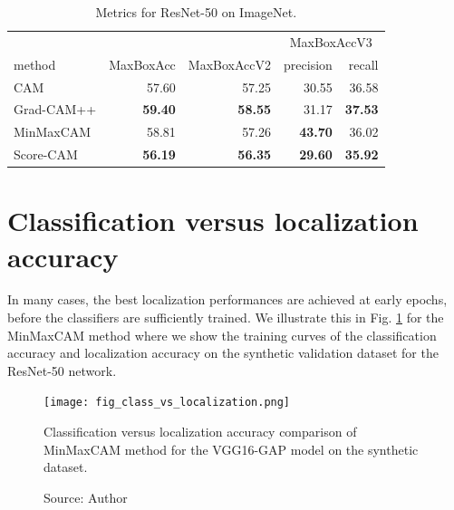 \begin{table}[ht]
\centering
\begin{tabular}{lrrrr}
\toprule
 & & & \multicolumn{2}{c}{MaxBoxAccV3} \\
method & MaxBoxAcc & MaxBoxAccV2 & precision & recall \\
\cmidrule(lr){1-1} \cmidrule(lr){2-5}
CAM & 57.60 & 57.25 & 30.55 & 36.58 \\
Grad-CAM++ & \color{teal} \bfseries 59.40 & \color{teal} \bfseries 58.55 & 31.17 & \color{teal} \bfseries 37.53 \\
MinMaxCAM & 58.81 & 57.26 & \color{teal} \bfseries 43.70 & 36.02 \\
Score-CAM & \color{purple} \bfseries 56.19 & \color{purple} \bfseries 56.35 & \color{purple} \bfseries 29.60 & \color{purple} \bfseries 35.92 \\
\bottomrule
\end{tabular}
\caption[Metrics for ResNet-50 on ImageNet]{Metrics for ResNet-50 on ImageNet.}
\label{tab:metrics_resnet50_imagenet}
\end{table}


\section{Classification versus localization accuracy}
In many cases, the best localization performances are achieved at early epochs, before the classifiers are sufficiently trained. We illustrate this in Fig. \ref{fig:classification_versus_localization2} for the MinMaxCAM method where we show the training curves of the classification accuracy and localization accuracy on the synthetic validation dataset for the ResNet-50 network. 

\begin{figure}[ht]
    \begin{center}       
    \texttt{[image: fig\_class\_vs\_localization.png]}
    \caption[Classification versus localization accuracy]{Classification versus localization accuracy comparison of MinMaxCAM method for the VGG16-GAP model on the synthetic dataset.}
    \caption*{Source: Author}
    \label{fig:classification_versus_localization2}
    \end{center}
\end{figure}

